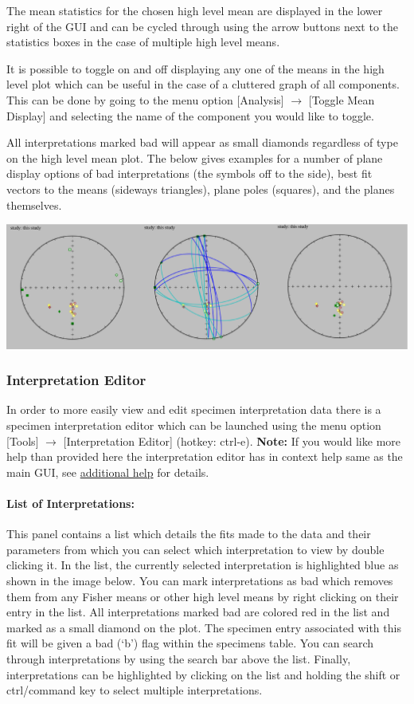 \documentclass[11pt]{book}
\begin{document}
{{\noindent The mean statistics for the chosen high level mean are displayed in the lower right of the GUI and can be cycled through using the arrow buttons next to the statistics boxes in the case of multiple high level means.

\noindent It is possible to toggle on and off displaying any one of the means in the high level plot which can be useful in the case of a cluttered graph of all components. This can be done by going to the menu option [Analysis] $\rightarrow$ [Toggle Mean Display] and selecting the name of the component you would like to toggle.

\noindent All interpretations marked bad will appear as small diamonds regardless of type on the high level mean plot. The below gives examples for a number of plane display options of bad interpretations (the symbols off to the side), best fit vectors to the means (sideways triangles), plane poles (squares), and the planes themselves.

\includegraphics[width=30 cm]{EPSFiles/demag_gui_HLMTypes.eps}

\subsubsection{Interpretation Editor}\label{interpretation-editor} %

In order to more easily view and edit specimen interpretation data there is a specimen interpretation editor which can be launched using the menu option [Tools] $\rightarrow$ [Interpretation Editor] (hotkey: ctrl-e). \textbf{Note:} If you would like more help than provided here the interpretation editor has in context help same as the main GUI, see \hyperref[add-help]{additional help} for details.
\paragraph{List of Interpretations:}\label{IE-list} This panel contains a list which details the fits made to the data and their parameters from which you can select which interpretation to view by double clicking it. In the list, the currently selected interpretation is highlighted blue as shown in the image below. You can mark interpretations as bad which removes them from any Fisher means or other high level means by right clicking on their entry in the list. All interpretations marked bad are colored red in the list and marked as a small diamond on the plot. The specimen entry associated with this fit will be given a bad (`b') flag within the specimens table. You can search through interpretations by using the search bar above the list. Finally, interpretations can be highlighted by clicking on the list and holding the shift or ctrl/command key to select multiple interpretations.
}}
\end{document}
